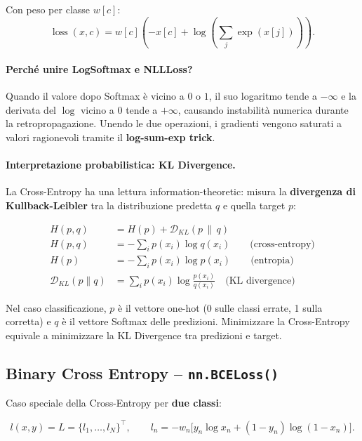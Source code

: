 Con peso per classe $w[c]$:
\begin{equation}
  \operatorname{loss}(x, c) = w[c]\!\left(-x[c] + \log\!\left(\sum_j \exp(x[j])\right)\right).
\end{equation}

\paragraph{Perché unire LogSoftmax e NLLLoss?}
Quando il valore dopo Softmax è vicino a $0$ o $1$, il suo logaritmo tende a
$-\infty$ e la derivata del $\log$ vicino a $0$ tende a $+\infty$, causando
instabilità numerica durante la retropropagazione. Unendo le due operazioni,
i gradienti vengono saturati a valori ragionevoli tramite il \textbf{log-sum-exp trick}.

\paragraph{Interpretazione probabilistica: KL Divergence.}
La Cross-Entropy ha una lettura information-theoretic: misura la
\textbf{divergenza di Kullback-Leibler} tra la distribuzione predetta $q$ e
quella target $p$:

\begin{align}
  H(p, q) &= H(p) + \mathcal{D}_{KL}(p \,\|\, q) \\
  H(p, q) &= -\sum_i p(x_i)\log q(x_i) \qquad \text{(cross-entropy)} \\
  H(p)    &= -\sum_i p(x_i)\log p(x_i) \qquad \text{(entropia)} \\
  \mathcal{D}_{KL}(p\|q) &= \sum_i p(x_i)\log\frac{p(x_i)}{q(x_i)} \quad \text{(KL divergence)}
\end{align}

Nel caso classificazione, $p$ è il vettore one-hot (0 sulle classi errate, 1 sulla
corretta) e $q$ è il vettore Softmax delle predizioni. Minimizzare la Cross-Entropy
equivale a minimizzare la KL Divergence tra predizioni e target.

\subsection{Binary Cross Entropy -- \texttt{nn.BCELoss()}}
\label{subsec:bce}

Caso speciale della Cross-Entropy per \textbf{due classi}:

\begin{equation}
  l(x, y) = L = \{l_1, \ldots, l_N\}^\top, \qquad
  l_n = -w_n\bigl[y_n \log x_n + (1-y_n)\log(1-x_n)\bigr].
\end{equation}

